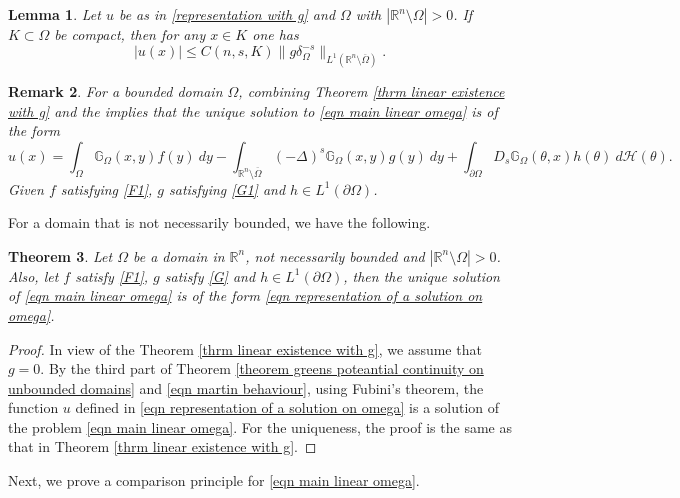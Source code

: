 \documentclass{amsart}
\newtheorem{theorem}{Theorem}[section]
\newtheorem{lemma}[theorem]{Lemma}
\newtheorem{remark}[theorem]{Remark}
\newcommand{\R}{\mathbb{R}}
\newcommand{\slap}{(-\Delta)^{s}}
\newcommand{\rn}{\mathbb{R}^{n}}
\newcommand{\gk}[1]{\mathbb{G}_{#1}}
\newcommand{\Ds}{D_{s}}
\begin{document}
\begin{lemma}\label{lemma bound of the sln ug}
  Let $u$ be as in \eqref{representation with g} and $\Omega$ with $|\rn\setminus\Omega|>0$. If $K\subset \Omega$ be compact, then for any $x\in K$  one has 
    \begin{equation*}\label{eqn l infty bound for solution with g}
        |u(x)|\leq C(n,s,K)\|g\delta_{\Omega}^{-s}\|_{L^{1}(\R^{n}\setminus\overline{\Omega})}.
    \end{equation*}  
\end{lemma}
\begin{remark}
    For a bounded domain $\Omega$, combining Theorem \ref{thrm linear existence with g} and the \cite[Theorem 2.5, Theorem 4.6]{AbatangeloVazquez2023} implies that the unique solution to \eqref{eqn main linear omega} is of the form
    \begin{equation}\label{eqn representation of a solution on omega}
    u(x)=\int_{\Omega}\gk{\Omega}(x,y)f(y)\ dy-\int_{\R^{n}\setminus\overline{\Omega}}\slap \gk{\Omega}(x,y)g(y)\ dy+\int_{\partial\Omega}\Ds\gk{\Omega}(\theta,x)h(\theta)\ d\mathcal{H}(\theta).  \end{equation}
    Given $f$ satisfying \ref{F1}, $g$ satisfying \ref{G1} and $h\in L^{1}(\partial\Omega)$.
\end{remark}
For a domain that is not necessarily bounded, we have the following.
\begin{theorem}\label{thrm rep of u on any domain}
    Let $\Omega$ be a domain in $\R^{n}$, not necessarily bounded and $|\R^{n}\setminus \Omega|>0$. Also, let $f$ satisfy \ref{F1}, $g$ satisfy \ref{G} and $h\in L^{1}(\partial\Omega)$, then the unique solution of \eqref{eqn main linear omega} is of the form \eqref{eqn representation of a solution on omega}.
\end{theorem}
\begin{proof}
    In view of the Theorem \ref{thrm linear existence with g}, we assume that $g=0$. By the third part of Theorem \ref{theorem greens poteantial continuity on unbounded domains} and \eqref{eqn martin behaviour}, using Fubini's theorem, the function $u$ defined in \eqref{eqn representation of a solution on omega} is a solution of the problem \eqref{eqn main linear omega}. For the uniqueness, the proof is the same as that in Theorem \ref{thrm linear existence with g}.
    \end{proof}
 
Next, we prove a comparison principle for \eqref{eqn main linear omega}.
\end{document}
